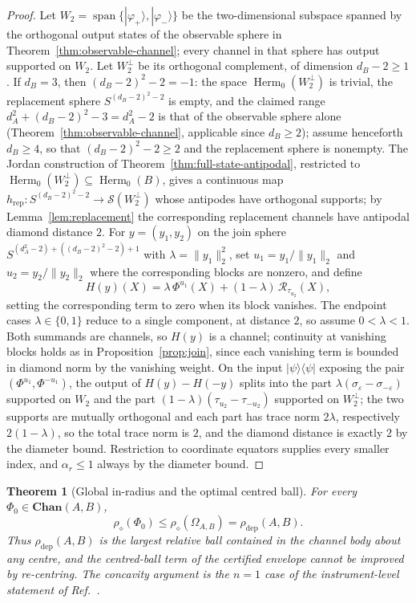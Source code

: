 \documentclass[11pt,a4paper]{article}
\theoremstyle{definition}
\theoremstyle{plain}
\newtheorem{theorem}{Theorem}[section]
\theoremstyle{remark}
\DeclareMathOperator{\Herm}{Herm}
\newcommand{\Chan}{\mathbf{Chan}}
\newcommand{\Sstate}{\mathcal{S}}
\newcommand{\rhodep}{\rho_{\mathrm{dep}}}
\begin{document}
\begin{proof}
Let $W_2=\operatorname{span}\{|\varphi_+\rangle,|\varphi_-\rangle\}$
be the two-dimensional subspace spanned by the orthogonal output states of
the observable sphere in Theorem~\ref{thm:observable-channel}; every
channel in that sphere has output supported on $W_2$. Let $W_2^\perp$ be
its orthogonal complement, of dimension $d_B-2\ge1$. If $d_B=3$, then
$(d_B-2)^2-2=-1$: the space $\Herm_0(W_2^\perp)$ is trivial, the replacement
sphere $S^{(d_B-2)^2-2}$ is empty, and the claimed range
$d_A^2+(d_B-2)^2-3=d_A^2-2$ is that of the observable sphere alone
(Theorem~\ref{thm:observable-channel}, applicable since $d_B\ge2$); assume
henceforth $d_B\ge4$, so that $(d_B-2)^2-2\ge2$ and the replacement sphere
is nonempty. The Jordan
construction of Theorem~\ref{thm:full-state-antipodal}, restricted to
$\Herm_0(W_2^\perp)\subseteq\Herm_0(B)$, gives a continuous map
$h_{\mathrm{rep}}:S^{(d_B-2)^2-2}\to\Sstate(W_2^\perp)$ whose antipodes have
orthogonal supports; by Lemma~\ref{lem:replacement} the corresponding
replacement channels have antipodal diamond distance $2$. For
$y=(y_1,y_2)$ on the join sphere
$S^{(d_A^2-2)+((d_B-2)^2-2)+1}$ with $\lambda=\|y_1\|_2^2$, set
$u_1=y_1/\|y_1\|_2$ and $u_2=y_2/\|y_2\|_2$ where the corresponding blocks
are nonzero, and define
\[
H(y)(X)=\lambda\,\Phi^{u_1}(X)+(1-\lambda)\,\mathcal R_{\tau_{u_2}}(X),
\]
setting the corresponding term to zero when its block vanishes. The
endpoint cases $\lambda\in\{0,1\}$ reduce to a single component, at distance
$2$, so assume $0<\lambda<1$. Both
summands are channels, so $H(y)$ is a channel; continuity at vanishing
blocks holds as in Proposition~\ref{prop:join}, since each vanishing term
is bounded in diamond norm by the vanishing weight. On the input
$|\psi\rangle\langle\psi|$ exposing the pair $(\Phi^{u_1},\Phi^{-u_1})$,
the output of $H(y)-H(-y)$ splits into the part
$\lambda(\sigma_\varepsilon-\sigma_{-\varepsilon})$ supported on $W_2$ and
the part $(1-\lambda)(\tau_{u_2}-\tau_{-u_2})$ supported on $W_2^\perp$; the two supports are mutually orthogonal and each part has
trace norm $2\lambda$, respectively $2(1-\lambda)$, so the total trace
norm is $2$, and the diamond distance is exactly $2$ by the diameter bound.
Restriction to coordinate equators supplies every smaller index, and
$\alpha_r\le1$ always by the diameter bound.
\end{proof}

\begin{theorem}[Global in-radius and the optimal centred ball]
\label{thm:global-inradius-channel}
For every $\Phi_0\in\Chan(A,B)$,
\[
\rho_\diamond(\Phi_0)\le\rho_\diamond(\Omega_{A,B})=\rhodep(A,B).
\]
Thus $\rhodep(A,B)$ is the largest relative ball contained in the channel
body about any centre, and the centred-ball term of the certified envelope
cannot be improved by re-centring. The concavity argument is the $n=1$
case of the instrument-level statement of Ref.~\cite{CompanionInstruments}.
\end{theorem}
\end{document}
